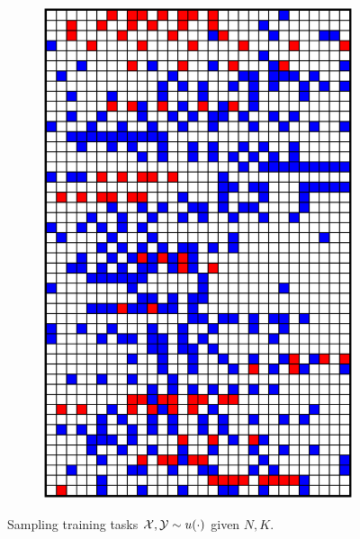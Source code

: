 \begin{figure}
\begin{minipage}[t]{0.33\textwidth}
\begin{figure}[H]
\includegraphics[width=\textwidth]{figs/fdm/training-2.pdf}
\end{figure}
\end{minipage}
\hfill
\begin{minipage}[t]{0.65\textwidth}
\begin{algorithm}[H]
    \caption{Sampling training tasks $\mathcal{X},\mathcal{Y}\sim u(\cdot)$ given $N,K$.}\label{alg:mask-distribution}
    \label{alg:training-distribution}
    \footnotesize
    \begin{algorithmic}[1]

\end{algorithmic}
\end{algorithm}
\end{minipage}
\end{figure}
